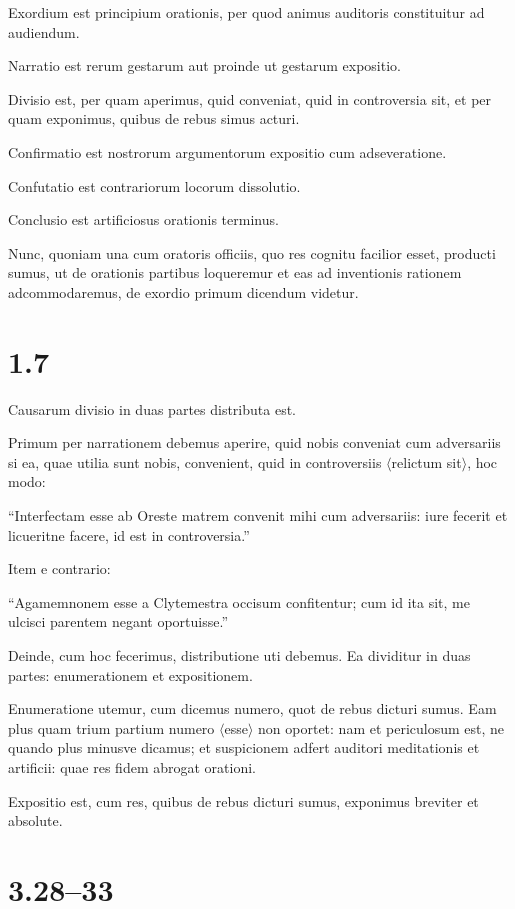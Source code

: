 Exordium est principium orationis, per quod animus auditoris constituitur ad audiendum.

Narratio est rerum gestarum aut proinde ut gestarum expositio.

Divisio est, per quam aperimus, quid conveniat, quid in controversia sit, et per quam exponimus, quibus de rebus simus acturi.

Confirmatio est nostrorum argumentorum expositio cum adseveratione.

Confutatio est contrariorum locorum dissolutio.

Conclusio est artificiosus orationis terminus.

Nunc, quoniam una cum oratoris officiis, quo res cognitu facilior esset, producti sumus, ut de orationis partibus loqueremur et eas ad inventionis rationem adcommodaremus, de exordio primum dicendum videtur.

\section*{1.7}

Causarum divisio in duas partes distributa est.

Primum per narrationem debemus aperire, quid nobis conveniat cum adversariis si ea, quae utilia sunt nobis, convenient, quid in controversiis $\langle$relictum sit$\rangle$, hoc modo:

``Interfectam esse ab Oreste matrem convenit mihi cum adversariis: iure fecerit et licueritne facere, id est in controversia.''

Item e contrario:

``Agamemnonem esse a Clytemestra occisum confitentur; cum id ita sit, me ulcisci parentem negant oportuisse.''

Deinde, cum hoc fecerimus, distributione uti debemus. Ea dividitur in duas partes: enumerationem et expositionem.

Enumeratione utemur, cum dicemus numero, quot de rebus dicturi sumus. Eam plus quam trium partium numero $\langle$esse$\rangle$ non oportet: nam et periculosum est, ne quando plus minusve dicamus; et suspicionem adfert auditori meditationis et artificii: quae res fidem abrogat orationi.

Expositio est, cum res, quibus de rebus dicturi sumus, exponimus breviter et absolute.

\section*{3.28–33}

